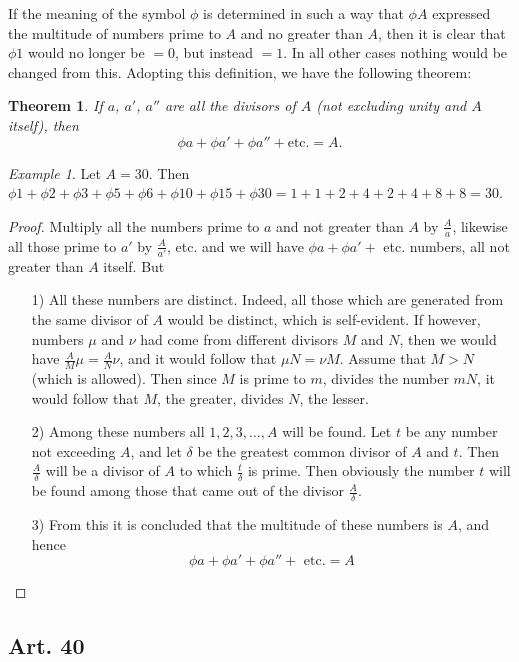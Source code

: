 \documentclass{book}
\theoremstyle{plain}
\newtheorem{theorem}{Theorem}
\theoremstyle{remark}
\newtheorem*{example}{Example}
\begin{document}
If the meaning of the symbol $\phi$ is determined in such a way that $\phi A$ expressed the multitude of numbers prime to $A$ and no greater than $A$, then it is clear that $\phi 1$ would no longer be $=0$, but instead $=1$.  In all other cases nothing would be changed from this.  Adopting this definition, we have the following theorem:
\begin{theorem} If $a$, $a'$, $a''$ are all the divisors of $A$ (not excluding unity and $A$ itself), then 
\[ \phi a + \phi a' + \phi a'' + \textrm{etc.} = A. \]
\end{theorem}
\begin{example} Let $A = 30$.  Then $\phi 1 + \phi 2 + \phi 3 + \phi 5 + \phi 6 + \phi 10 + \phi 15 + \phi 30 = 1 + 1 + 2 + 4 + 2 + 4 + 8 + 8 = 30$. \end{example}
\begin{proof} Multiply all the numbers prime to $a$ and not greater than $A$ by $\frac{A}{a}$, likewise all those prime to $a'$ by $\frac{A}{a'}$, etc. and we will have $\phi a + \phi a' + $ etc. numbers, all not greater than $A$ itself.  But 
\begin{itemize}
\item[1)] All these numbers are distinct.  Indeed, all those which are generated from the same divisor of $A$ would be distinct, which is self-evident.   If however, numbers $\mu$ and $\nu$ had come from different divisors $M$ and $N$, then we would have $\frac{A}{M} \mu = \frac{A}{N} \nu$, and it would follow that $\mu N = \nu M$.  Assume that $M>N$ (which is allowed).  Then since $M$ is prime to $m$, divides the number $mN$, it would follow that $M$, the greater, divides $N$, the lesser.
\item[2)] Among these numbers all $1, 2, 3, \dots, A$ will be found.  Let $t$ be any number not exceeding $A$, and let $\delta$ be the greatest common divisor of $A$ and $t$.  Then $\frac{A}{\delta}$ will be a divisor of $A$ to which $\frac{t}{\delta}$ is prime. Then obviously the number $t$ will be found among those that came out of the divisor $\frac{A}{\delta}$.
\item[3)] From this it is concluded that the multitude of these numbers is $A$, and hence
\[ \phi a + \phi a' + \phi a'' + \textrm{ etc.} = A \]
\end{itemize}
\end{proof}

\subsection*{Art. 40} 
\end{document}
